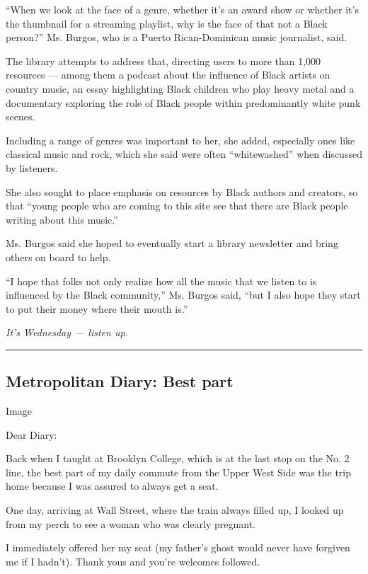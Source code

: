 ``When we look at the face of a genre, whether it's an award show or
whether it's the thumbnail for a streaming playlist, why is the face of
that not a Black person?'' Ms. Burgos, who is a Puerto Rican-Dominican
music journalist, said.

The library attempts to address that, directing users to more than 1,000
resources --- among them a podcast about the influence of Black artists
on country music, an essay highlighting Black children who play heavy
metal and a documentary exploring the role of Black people within
predominantly white punk scenes.

Including a range of genres was important to her, she added, especially
ones like classical music and rock, which she said were often
``whitewashed'' when discussed by listeners.

She also sought to place emphasis on resources by Black authors and
creators, so that ``young people who are coming to this site see that
there are Black people writing about this music.''

Ms. Burgos said she hoped to eventually start a library newsletter and
bring others on board to help.

``I hope that folks not only realize how all the music that we listen to
is influenced by the Black community,'' Ms. Burgos said, ``but I also
hope they start to put their money where their mouth is.''

\emph{It's Wednesday --- listen up.}

\begin{center}\rule{0.5\linewidth}{\linethickness}\end{center}

\hypertarget{metropolitan-diary-best-part}{%
\subsection{Metropolitan Diary: Best
part}\label{metropolitan-diary-best-part}}

Image

Dear Diary:

Back when I taught at Brooklyn College, which is at the last stop on the
No. 2 line, the best part of my daily commute from the Upper West Side
was the trip home because I was assured to always get a seat.

One day, arriving at Wall Street, where the train always filled up, I
looked up from my perch to see a woman who was clearly pregnant.

I immediately offered her my seat (my father's ghost would never have
forgiven me if I hadn't). Thank yous and you're welcomes followed.

